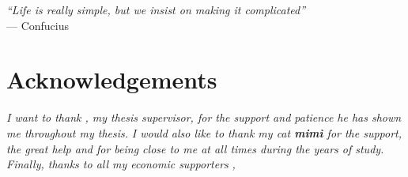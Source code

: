 \cleardoublepage{}

\begin{flushright}{
    \slshape
    ``Life is really simple, but we insist on making it complicated''} \\
    \medskip
    --- Confucius
\end{flushright}


\bigskip

\begingroup
\let\clearpage\relax
\let\cleardoublepage\relax
\let\cleardoublepage\relax

\chapter*{Acknowledgements}

\noindent \textit{I want to thank \myProf, my thesis supervisor, for the support and patience he has shown me throughout my thesis.}
\noindent \textit{I would also like to thank my cat \textbf{mimì} for the support, the great help and for being close to me at all times during the years of study.}
\noindent \textit{Finally, thanks to all my economic supporters}
\bigskip
\noindent\textit{\myLocation, \myTime}
\hfill\myName\endgroup
